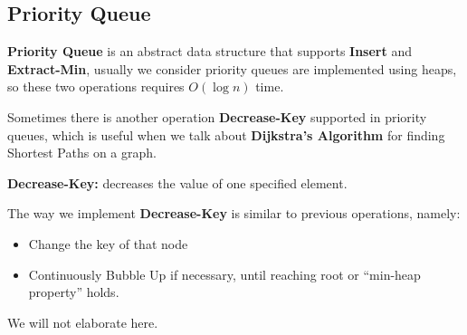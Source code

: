 \begin{spacing}{1.3}
    \vspace{0.3in}
    \section{Priority Queue}

    {\bf Priority Queue} is an abstract data structure that supports {\bf Insert} and 
    {\bf Extract-Min}, usually we consider priority queues are implemented using 
    heaps, so these two operations requires $O(\log n)$ time.

    Sometimes there is another operation {\bf Decrease-Key} supported in priority queues,
    which is useful when we talk about {\bf Dijkstra's Algorithm} for finding 
    Shortest Paths on a graph.

    \begin{definition}
        {\bf Decrease-Key:} decreases the value of one specified element.
    \end{definition}

    The way we implement {\bf Decrease-Key} is similar to previous operations, namely:
    \begin{itemize}
        \item Change the key of that node
        \item Continuously Bubble Up if necessary, until reaching root or ``min-heap property''
        holds.
    \end{itemize}
    We will not elaborate here.



\end{spacing}